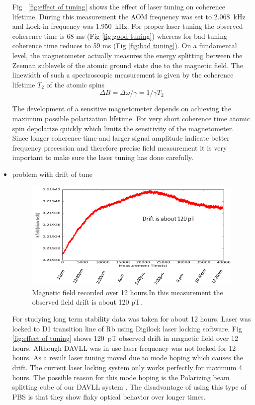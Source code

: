 \begin{itemize}
	Fig~ \ref{fig:effect of tuning} shows the effect of laser tuning on coherence lifetime. During this measurement the AOM frequency was set to 2.068~kHz and Lock-in frequency was 1.950~kHz.  For proper laser tuning the observed coherence time is 68 ms (Fig \ref{fig:good tuning}) whereas for bad tuning coherence time reduces to 59 ms (Fig \ref{fig:bad tuning}). On a fundamental level, the magnetometer actually measures the energy splitting between the Zeeman sublevels of the atomic ground state due to the magnetic field. The linewidth of such a spectroscopic measurement is given by the coherence lifetime $T_2$ of the atomic spins \cite{bib:Seltzer_thesis}
\begin{equation}
 \Delta B = \Delta\omega/\gamma  = 1/γ T_2
\end{equation}

The development of a sensitive magnetometer depends on achieving the maximum possible polarization lifetime.  For very short coherence time atomic spin depolarize quickly which limits the sensitivity of the magnetometer.
Since  longer coherence time and larger signal amplitude indicate better frequency precession and therefore precise field measurement it is very important to make sure the laser tuning has done carefully.
  
   \item problem with drift of tune
      \begin{figure}[h]
\centering\includegraphics[width=0.6\linewidth]{figures/field_drift}
\caption{Magnetic field recorded over 12 hours.In this measurement the observed field drift is about 120 pT.\label{digilock field drift}}
\end{figure}
   For studying long term stability data was taken for about 12 hours. Laser was locked to D1 transition line of Rb using Digilock laser locking software. Fig \ref{fig:effect of tuning} shows 120~pT observed drift in magnetic field over 12 hours. Although DAVLL was in use laser frequency was not locked for 12 hours. As a result laser tuning moved due to mode hoping which causes the drift. The current laser locking system only works perfectly for maximum 4 hours. The possible reason for this mode hoping is the Polarizing beam splitting cube of our DAVLL system \cite{principles}. The disadvantage of using this type of PBS is that they show flaky optical behavior over longer times.


\end{itemize}

